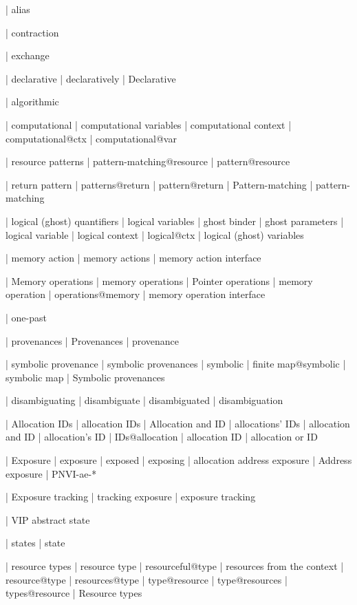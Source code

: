  | alias

 | contraction

 | exchange

 | declarative
 | declaratively
 | Declarative

 | algorithmic

 | computational
 | computational variables
 | computational context
 | computational@ctx
 | computational@var

 | resource patterns
 | pattern-matching@resource
 | pattern@resource

 | return pattern
 | patterns@return
 | pattern@return
 | Pattern-matching
 | pattern-matching

 | logical (ghost) quantifiers
 | logical variables
 | ghost binder
 | ghost parameters
 | logical variable
 | logical context
 | logical@ctx
 | logical (ghost) variables

 | memory action
 | memory actions
 | memory action interface

 | Memory operations
 | memory operations
 | Pointer operations
 | memory operation
 | operations@memory
 | memory operation interface

 | one-past

 | provenances
 | Provenances
 | provenance

 | symbolic provenance
 | symbolic provenances
 | symbolic
 | finite map@symbolic
 | symbolic map
 | Symbolic provenances

 | disambiguating
 | disambiguate
 | disambiguated
 | disambiguation

 | Allocation IDs
 | allocation IDs
 | Allocation and ID
 | allocations' IDs
 | allocation and ID
 | allocation's ID
 | IDs@allocation
 | allocation ID
 | allocation or ID

 | Exposure
 | exposure
 | exposed
 | exposing
 | allocation address exposure
 | Address exposure
 | PNVI-ae-*

 | Exposure tracking
 | tracking exposure
 | exposure tracking

 | VIP abstract state

 | states
 | state

 | resource types
 | resource type
 | resourceful@type
 | resources from the context
 | resource@type
 | resources@type
 | type@resource
 | type@resources
 | types@resource
 | Resource types

